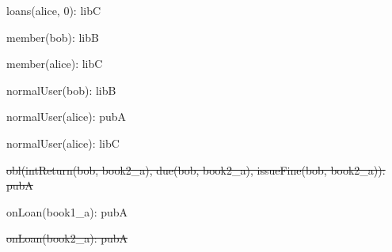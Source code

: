 \documentclass{article}
\begin{document}
{\begin{minipage}{\tableWidth}
\begin{description}[align=left,leftmargin=1em,noitemsep,labelsep=\parindent]
\item{{loans(\allowbreak{}alice, 0): libC}}
\item{{member(\allowbreak{}bob): libB}}
\item{{member(\allowbreak{}alice): libC}}
\item{{normalUser(\allowbreak{}bob): libB}}
\item{{normalUser(\allowbreak{}alice): pubA}}
\item{{normalUser(\allowbreak{}alice): libC}}
\item{\sout{obl(\allowbreak{}intReturn(\allowbreak{}bob, book2\_a), due(\allowbreak{}bob, book2\_a), issueFine(\allowbreak{}bob, book2\_a)): pubA}}
\item{{onLoan(\allowbreak{}book1\_a): pubA}}
\item{\sout{onLoan(\allowbreak{}book2\_a): pubA}}
\end{description}\end{minipage}}
\end{document}
